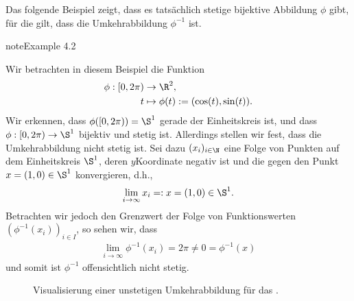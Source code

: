 \documentclass[letterpaper,10pt,english]{jupyterBook}
\let\sphinxpxdimen\pdfpxdimen\else\newdimen\sphinxpxdimen
\begin{document}
\sphinxAtStartPar
Das folgende Beispiel zeigt, dass es tatsächlich stetige bijektive Abbildung \(\phi\) gibt, für die gilt, dass die Umkehrabbildung \(\phi^{-1}\)  ist.
\label{manifolds/manifolds_prelim:ex:nonho}
\begin{sphinxadmonition}{note}{Example 4.2}



\sphinxAtStartPar
Wir betrachten in diesem Beispiel die Funktion
\begin{equation*}
\begin{split}\phi:[0,2\pi)&\to\R^2,\\
t &\mapsto \phi(t):= (\cos(t), \sin(t)).\end{split}
\end{equation*}
\sphinxAtStartPar
Wir erkennen, dass \(\phi([0,2\pi)) = \S^1\) gerade der Einheitskreis ist, und dass \(\phi:[0,2\pi)\to\S^1\) bijektiv und stetig ist.
Allerdings stellen wir fest, dass die Umkehrabbildung nicht stetig ist.
Sei dazu \((x_i)_{i\in\N}\) eine Folge von Punkten auf dem Einheitskreis \(\S^1\), deren \(y\)\sphinxhyphen{}Koordinate negativ ist und die gegen den Punkt \(x = (1,0) \in \S^1\) konvergieren, d.h.,
\begin{equation*}
\begin{split}\lim_{i\rightarrow\infty} x_i =: x = (1,0) \in \S^1.\end{split}
\end{equation*}
\sphinxAtStartPar
Betrachten wir jedoch den Grenzwert der Folge von Funktionswerten \((\phi^{-1}(x_i))_{i\in I}\), so sehen wir, dass
\begin{equation*}
\begin{split}\lim_{i\to\infty} \phi^{-1} (x_i) = 2\pi \neq 0 = \phi^{-1}(x)\end{split}
\end{equation*}
\sphinxAtStartPar
und somit ist \(\phi^{-1}\) offensichtlich nicht stetig.
\end{sphinxadmonition}

\begin{figure}[htbp]
\centering
\capstart

\noindent\sphinxincludegraphics[height=450\sphinxpxdimen]{{nonhomöo}.jpg}
\caption{Visualisierung einer unstetigen Umkehrabbildung für das {\hyperref[\detokenize{manifolds/manifolds_prelim:ex:nonho}]{}}.}\label{\detokenize{manifolds/manifolds_prelim:fig-nonh}}\end{figure}
\end{document}

